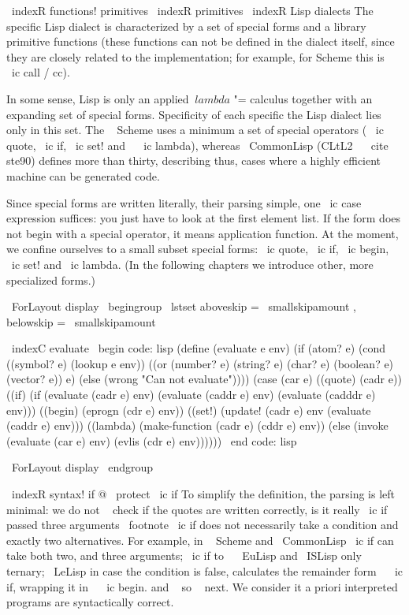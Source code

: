 \ indexR {functions! primitives}
\ indexR {primitives}
\ indexR {Lisp dialects}
The specific Lisp dialect is characterized by a set of special forms and a library
primitive functions (these functions can not be defined in the dialect itself, since
they are closely related to the implementation; for example, for Scheme this is ~ \ ic {call / cc}).

In some sense, Lisp is only an applied $ \ lambda $ "= calculus
together with an expanding set of special forms. Specificity of each specific
the Lisp dialect lies only in this set. The ~ Scheme uses a minimum
a set of special operators ( \ ic {quote}, \ ic {if}, \ ic {set!} and ~ \ ic {lambda}),
whereas { \ CommonLisp } (CLtL2 ~ \ cite {ste90}) defines more than thirty, describing
thus, cases where a highly efficient machine can be generated
code.

Since special forms are written literally, their parsing
simple, one \ ic {case} expression suffices: you just have to look at the first element
list. If the form does not begin with a special operator, it means
application function. At the moment, we confine ourselves to a small subset
special forms: \ ic {quote}, \ ic {if}, \ ic {begin}, \ ic {set!} and \ ic {lambda}.
(In the following chapters we introduce other, more specialized forms.)

\ ForLayout {display} { \ begingroup
\ lstset {aboveskip = \ smallskipamount , belowskip = \ smallskipamount }}

\ indexC {evaluate}
\ begin {code: lisp}
(define (evaluate e env)
  (if (atom? e)
      (cond ((symbol? e) (lookup e env))
            ((or (number? e) (string? e) (char? e)
                 (boolean? e) (vector? e)) e)
            (else (wrong "Can not evaluate"))))
      (case (car e)
        ((quote) (cadr e))
        ((if) (if (evaluate (cadr e) env)
                      (evaluate (caddr e) env)
                      (evaluate (cadddr e) env)))
        ((begin) (eprogn (cdr e) env))
        ((set!) (update! (cadr e) env (evaluate (caddr e) env)))
        ((lambda) (make-function (cadr e) (cddr e) env))
        (else (invoke (evaluate (car e) env)
                          (evlis (cdr e) env))))))
\ end {code: lisp}

\ ForLayout {display} { \ endgroup }

\ indexR {syntax! if @ \ protect \ ic {if}}
To simplify the definition, the parsing is left minimal: we
do not ~ check if the quotes are written correctly, is it really \ ic {if} passed
three arguments \ footnote { \ ic {if} does not necessarily take a condition and exactly two
alternatives. For example, in ~ Scheme and { \ CommonLisp } \ ic {if} can take both
two, and three arguments; \ ic {if} to ~ { \ EuLisp } and { \ ISLisp } only
ternary; { \ LeLisp } in case the condition is false, calculates the remainder
form ~ \ ic {if}, wrapping it in ~ \ ic {begin}.} and ~ so ~ next. We consider it a priori
interpreted programs are syntactically correct.



